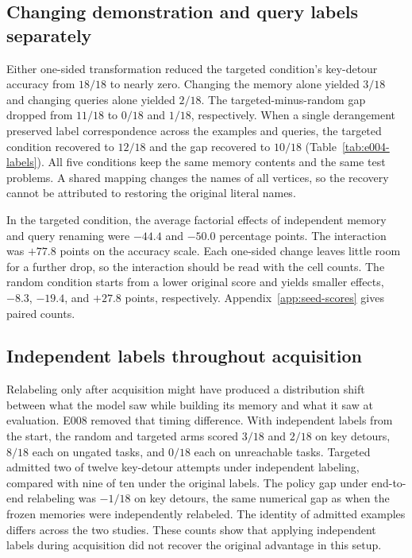 \documentclass[11pt]{article}
\begin{document}


\subsection{Changing demonstration and query labels separately}

Either one-sided transformation reduced the targeted condition's
key-detour accuracy from $18/18$ to nearly zero. Changing the
memory alone yielded $3/18$ and changing queries alone yielded
$2/18$. The targeted-minus-random gap dropped from $11/18$ to
$0/18$ and $1/18$, respectively. When a single derangement
preserved label correspondence across the examples and queries,
the targeted condition recovered to $12/18$ and the gap recovered
to $10/18$ (Table~\ref{tab:e004-labels}). All five conditions keep
the same memory contents and the same test problems. A shared
mapping changes the names of all vertices, so the recovery cannot
be attributed to restoring the original literal names.



In the targeted condition, the average factorial effects of
independent memory and query renaming were $-44.4$ and $-50.0$
percentage points. The interaction was $+77.8$ points on the
accuracy scale. Each one-sided change leaves little room for a
further drop, so the interaction should be read with the cell
counts. The random condition starts from a lower original score
and yields smaller effects, $-8.3$, $-19.4$, and $+27.8$ points,
respectively. Appendix~\ref{app:seed-scores} gives paired counts.

\subsection{Independent labels throughout acquisition}

Relabeling only after acquisition might have produced a distribution
shift between what the model saw while building its memory and what
it saw at evaluation. E008 removed that timing difference. With
independent labels from the start, the random and targeted arms
scored $3/18$ and $2/18$ on key detours, $8/18$ each on ungated
tasks, and $0/18$ each on unreachable tasks. Targeted admitted
two of twelve key-detour attempts under independent labeling,
compared with nine of ten under the original labels. The policy
gap under end-to-end relabeling was $-1/18$ on key detours, the
same numerical gap as when the frozen memories were independently
relabeled. The identity of admitted examples differs across
the two studies. These counts show that applying independent
labels during acquisition did not recover the original advantage
in this setup.
\end{document}
